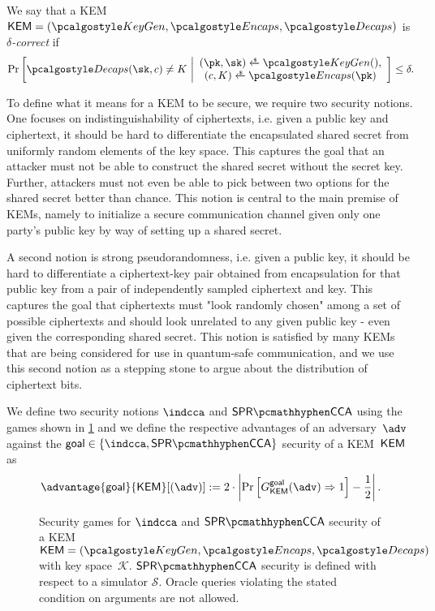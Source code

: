\begin{definition}
\label{def:kem-corr}
We say that a KEM~$\KEM=(\kgen,\encaps, \decaps)$ is \emph{$\delta$-correct} if
\[
    \Pr\left[
        \decaps(\sk,c) \neq K
    ~\middle|
        \begin{array}{c}
        (\pk,\sk) \getsr \kgen(), \\
        (c, K) \getsr \encaps(\pk)
        \end{array}
    \right] \leq \delta.
\]
\end{definition}

To define what it means for a KEM to be secure, we require two security notions. One focuses on indistinguishability of ciphertexts, i.e. given a public key and ciphertext, it should be hard to differentiate the encapsulated shared secret from uniformly random elements of the key space. This captures the goal that an attacker must not be able to construct the shared secret without the secret key. Further, attackers must not even be able to pick between two options for the shared secret better than chance. This notion is central to the main premise of KEMs, namely to initialize a secure communication channel given only one party's public key by way of setting up a shared secret.

A second notion is strong pseudorandomness, i.e. given a public key, it should be hard to differentiate a ciphertext-key pair obtained from encapsulation for that public key from a pair of independently sampled ciphertext and key. This captures the goal that ciphertexts must "look randomly chosen" among a set of possible ciphertexts and should look unrelated to any given public key - even given the corresponding shared secret. This notion is satisfied by many KEMs that are being considered for use in quantum-safe communication, and we use this second notion as a stepping stone to argue about the distribution of ciphertext bits.

\begin{definition} \label{def:kem-security}
    We define two security notions $\indcca$ and $\sprcca$ using the games shown in \cref{fig:kem-security} and we define the respective advantages of an adversary~$\adv$ against the $\textsf{goal} \in \{\indcca, \sprcca\}$ security of a KEM~$\textsf{KEM}$ as
\[
    \advantage{\textsf{goal}}{\KEM}[(\adv)] := 2 \cdot \left| \Pr \left[ G^{\textsf{goal}}_{\KEM}(\adv) \Rightarrow 1 \right] - \frac{1}{2} \right|.
\]
\end{definition}

\begin{figure}
    
    \caption[%
        Security games for $\indcca$ and $\sprcca$ security of a KEM or obfuscated KEM.
    ]{%
        Security games for $\indcca$ and $\sprcca$ security of a KEM~$\KEM = (\kgen, \encaps, \decaps)$ with key space~$\mathcal K$. $\sprcca$ security is defined with respect to a simulator $\mathcal S$. Oracle queries violating the stated condition on arguments are not allowed.
    }
    \label{fig:kem-security}
\end{figure}

